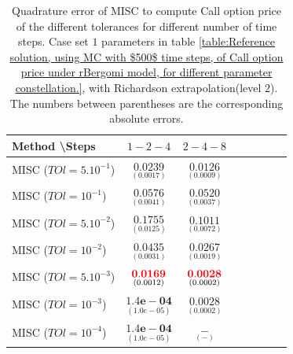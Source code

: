 \documentclass[11pt]{article}
\begin{document}
\begin{table}[!h]
\centering
\begin{tabular}{l*{6}{c}r}
Method \textbackslash  Steps            & $1-2-4$ & $2-4-8$  \\
\hline
MISC ($TOl=5.10^{-1}$)  & $\underset{(     0.0017)}{\mathbf{    0.0239}}$ & $\underset{(0.0009)}{\mathbf{0.0126}}$ \\
MISC ($TOl=10^{-1}$)  & $\underset{(   0.0041)}{\mathbf{  0.0576}}$ & $\underset{(0.0037)}{\mathbf{0.0520}}$  \\
MISC ($TOl=5.10^{-2}$)  & $\underset{(  0.0125)}{\mathbf{   0.1755}}$ & $\underset{(0.0072)}{\mathbf{0.1011}}$   \\
MISC ($TOl=10^{-2}$)  & $\underset{(0.0031)}{\mathbf{0.0435}}$ &    $\underset{(0.0019)}{\mathbf{0.0267}}$   \\

MISC ($TOl=5.10^{-3}$)  & $\underset{(0.0012)}{\mathbf{
		{\color{red}0.0169}}}$ &    $\underset{(0.0002
	)}{\mathbf{{\color{red} 0.0028}}}$ \\
MISC ($TOl=10^{-3}$)  & $\underset{(1.0e-05
	)}{\mathbf{
		1.4e-04}}$ &    $\underset{(0.0002
	)}{\mathbf{ 0.0028}}$ \\

MISC ($TOl=10^{-4}$)  & $\underset{(1.0e-05
	)}{\mathbf{
		1.4e-04}}$&    $\underset{(-
	
	)}{\mathbf{-}}$   \\
\hline
\end{tabular}
\caption{Quadrature error of MISC to compute Call option price of the different tolerances for different number of time steps. Case set $1$ parameters in table \ref{table:Reference solution, using MC with $500$ time steps, of Call option price under rBergomi model, for different parameter constellation.}, with Richardson extrapolation(level $2$). The numbers between parentheses are the corresponding absolute errors.}
\label{Quadrature error of MISC to compute Call option price of the different tolerances for different number of time steps. Case set $1$ parameters, with Richardson extrapolation(level $2$). The numbers between parentheses are the corresponding absolute errors.}
\end{table}
\end{document}
